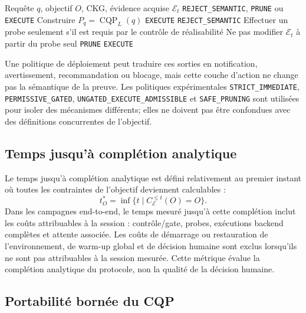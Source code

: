 \documentclass[journal]{IEEEtran}
\begin{document}
\begin{algorithm}[!t]
\caption{Contrôle objectif-relatif avec élagage sûr}
\label{alg:safe-control}
\begin{algorithmic}[1]
\REQUIRE Requête $q$, objectif $O$, CKG, évidence acquise $\mathcal{E}_t$
\ENSURE \texttt{REJECT\_SEMANTIC}, \texttt{PRUNE} ou \texttt{EXECUTE}
\STATE Construire $P_q=\operatorname{CQP}_L(q)$
  \RETURN \texttt{EXECUTE} 
\ENDIF
{}
  \RETURN \texttt{REJECT\_SEMANTIC}
\ENDIF
\STATE Effectuer un probe seulement s'il est requis par le contrôle de réalisabilité
\STATE Ne pas modifier $\mathcal{E}_t$ à partir du probe seul
  \RETURN \texttt{PRUNE}
\ENDIF
\RETURN \texttt{EXECUTE} 
\end{algorithmic}
\end{algorithm}

Une politique de déploiement peut traduire ces sorties en notification, avertissement, recommandation ou blocage, mais cette couche d'action ne change pas la sémantique de la preuve. Les politiques expérimentales \texttt{STRICT\_IMMEDIATE}, \texttt{PERMISSIVE\_GATED}, \texttt{UNGATED\_EXECUTE\_ADMISSIBLE} et \texttt{SAFE\_PRUNING} sont utilisées pour isoler des mécanismes différents; elles ne doivent pas être confondues avec des définitions concurrentes de l'objectif.

\subsection{Temps jusqu'à complétion analytique}

Le temps jusqu'à complétion analytique est défini relativement au premier instant où toutes les contraintes de l'objectif deviennent calculables :
\[
t_O^*
=
\inf\{t\mid C_{\mathcal{E}}^{\le t}(O)=O\}.
\]
Dans les campagnes end-to-end, le temps mesuré jusqu'à cette complétion inclut les coûts attribuables à la session : contrôle/gate, probes, exécutions backend complètes et attente associée. Les coûts de démarrage ou restauration de l'environnement, de warm-up global et de décision humaine sont exclus lorsqu'ils ne sont pas attribuables à la session mesurée. Cette métrique évalue la complétion analytique du protocole, non la qualité de la décision humaine.

\subsection{Portabilité bornée du CQP}
\end{document}

